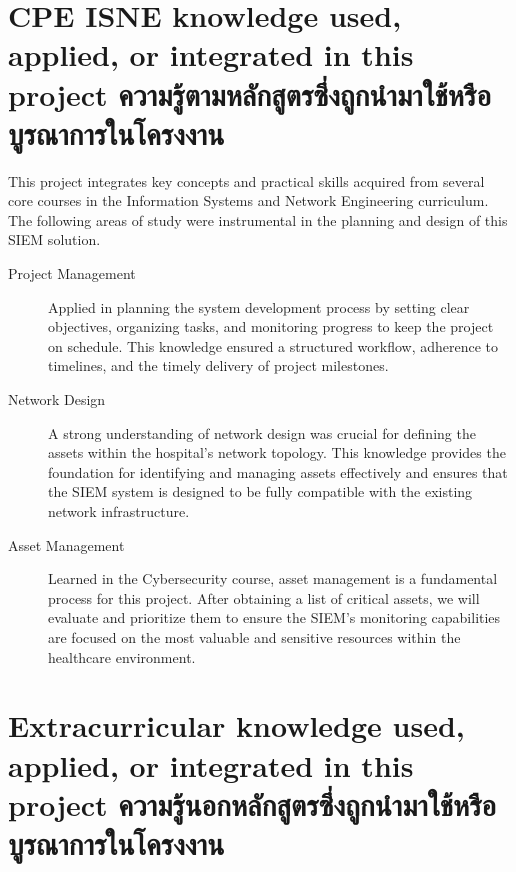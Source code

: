 
\section{\ifenglish%
\ifcpe CPE \else ISNE \fi knowledge used, applied, or integrated in this project
\else%
ความรู้ตามหลักสูตรซึ่งถูกนำมาใช้หรือบูรณาการในโครงงาน
\fi
}

\label{sec:coursework-integration}

This project integrates key concepts and practical skills acquired from several core courses in the Information Systems and Network Engineering curriculum. The following areas of study were instrumental in the planning and design of this SIEM solution.

\begin{description}
    \item[Project Management] Applied in planning the system development process by setting clear objectives, organizing tasks, and monitoring progress to keep the project on schedule. This knowledge ensured a structured workflow, adherence to timelines, and the timely delivery of project milestones.

    \item[Network Design] A strong understanding of network design was crucial for defining the assets within the hospital's network topology. This knowledge provides the foundation for identifying and managing assets effectively and ensures that the SIEM system is designed to be fully compatible with the existing network infrastructure.

    \item[Asset Management] Learned in the Cybersecurity course, asset management is a fundamental process for this project. After obtaining a list of critical assets, we will evaluate and prioritize them to ensure the SIEM's monitoring capabilities are focused on the most valuable and sensitive resources within the healthcare environment.
    
\end{description}
\break
\section{\ifenglish%
Extracurricular knowledge used, applied, or integrated in this project
\else%
ความรู้นอกหลักสูตรซึ่งถูกนำมาใช้หรือบูรณาการในโครงงาน
\fi
}

